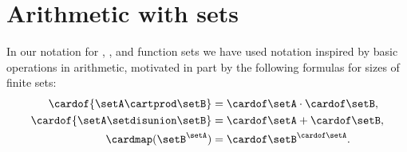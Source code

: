 \section{Arithmetic with sets}
\label{sec:arithmetic-with-sets}

In our notation for , , and function sets we have used notation inspired by basic operations in arithmetic, motivated in part by the following formulas for sizes of finite sets:
\begin{align}
    \cardof{\setA \cartprod \setB}    & = \cardof \setA \cdot \cardof \setB, \\
    \cardof{\setA \setdisunion \setB} & = \cardof \setA + \cardof \setB, \\
    \cardmap(\setB^{\setA})           & = {\cardof\setB}^{\cardof\setA}.
\end{align}

